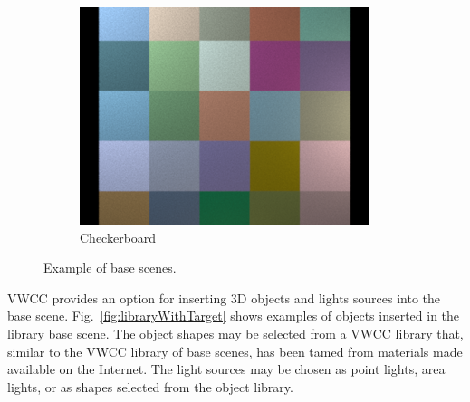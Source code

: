 \documentclass{jov}
\begin{document}
\begin{figure}[t]
\begin{subfigure}[b]{0.22 \textwidth}
        \includegraphics[width=\textwidth]{Figure11/baseSceneCheckerBoard.png}
        \caption{Checkerboard}
        \label{fig:baseSceneCheckerBoard}
    \end{subfigure}
    \caption{Example of base scenes.}\label{fig:baseScenes}
\end{figure}

VWCC provides an option for inserting 3D objects and lights sources into the base scene. Fig.~\ref{fig:libraryWithTarget} shows examples of objects inserted in the library base scene. The object shapes may be selected from a VWCC library that, similar to the VWCC library of base scenes, has been tamed from materials made available on the Internet. The light sources may be chosen as point lights, area lights, or as shapes selected from the object library.
\end{document}
